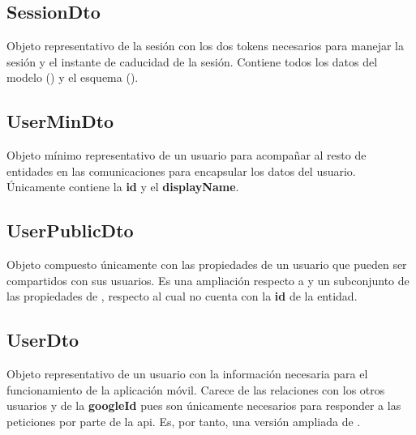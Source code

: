 \subsection{SessionDto}
\label{dto:session}

Objeto representativo de la sesión con los dos \glspl{token} necesarios para manejar la sesión y el instante de caducidad de la sesión. Contiene todos los datos del modelo () y el esquema ().



\subsection{UserMinDto}
\label{dto:usermin}

Objeto mínimo representativo de un usuario para acompañar al resto de entidades en las comunicaciones para encapsular los datos del usuario. Únicamente contiene la \textbf{id} y el \textbf{displayName}.



\subsection{UserPublicDto}
\label{dto:userpublic}

Objeto compuesto únicamente con las propiedades de un usuario que pueden ser compartidos con sus usuarios. Es una ampliación respecto a  y un subconjunto de las propiedades de , respecto al cual no cuenta con la \textbf{id} de la entidad.



\subsection{UserDto}
\label{dto:user}

Objeto representativo de un usuario con la información necesaria para el funcionamiento de la aplicación móvil. Carece de las relaciones con los otros usuarios y de la \textbf{googleId} pues son únicamente necesarios para responder a las peticiones por parte de la \acrshort{api}. Es, por tanto, una versión ampliada de .

